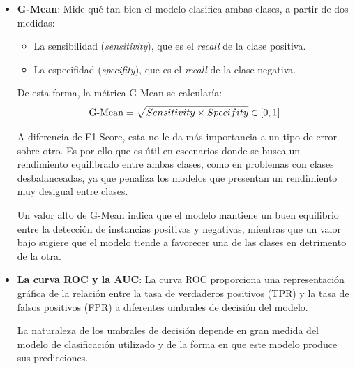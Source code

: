 \begin{itemize}
    Esta métrica es especialmente útil cuando se tienen conjuntos de datos desbalanceados, donde hay muchas más instancias de una clase que de otra. 

    Por contraparte, proporciona una medida combinada de la precisión y el \textit{recall}, que puede no ser tan intuitiva de interpretar como otras métricas más simples, como la \textit{accuracy}.

    
    \item \textbf{G-Mean}: Mide qué tan bien el modelo clasifica ambas clases, a partir de dos medidas:
    
    \begin{itemize}
        \item La sensibilidad (\textit{sensitivity}), que es el \textit{recall} de la clase positiva.
        \item La especifidad (\textit{specifity}), que es el \textit{recall} de la clase negativa. 
    \end{itemize}

    De esta forma, la métrica G-Mean se calcularía:
    $$
    \textnormal{G-Mean} = \sqrt{Sensitivity \times Specifity} \in \left[0,1\right]
    $$

    A diferencia de F1-Score, esta no le da más importancia a un tipo de error sobre otro. Es por ello que es útil en escenarios donde se busca un rendimiento equilibrado entre ambas clases, como en problemas con clases desbalanceadas, ya que penaliza los modelos que presentan un rendimiento muy desigual entre clases. 

    Un valor alto de G-Mean indica que el modelo mantiene un buen equilibrio entre la detección de instancias positivas y negativas, mientras que un valor bajo sugiere que el modelo tiende a favorecer una de las clases en detrimento de la otra.


    \item \textbf{La curva ROC y la AUC}: La curva ROC proporciona una representación gráfica de la relación entre la tasa de verdaderos positivos (TPR) y la tasa de falsos positivos (FPR) a diferentes umbrales de decisión del modelo.

    La naturaleza de los umbrales de decisión depende en gran medida del modelo de clasificación utilizado y de la forma en que este modelo produce sus predicciones.


\end{itemize}
